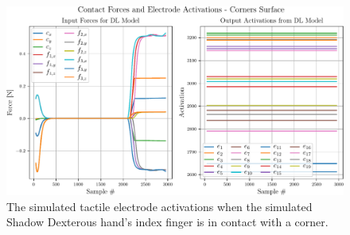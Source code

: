 \begin{figure}[h]
	\begin{center}
		\includegraphics[width=\textwidth]{chapters/1-tactile-perception/fig/matplotlib/corners-contact-graph.pdf}
	\end{center}
	\caption{The simulated tactile electrode activations when the simulated Shadow Dexterous hand's index finger is in contact with a corner.}
	\label{app:corner-contact-graph}
\end{figure}